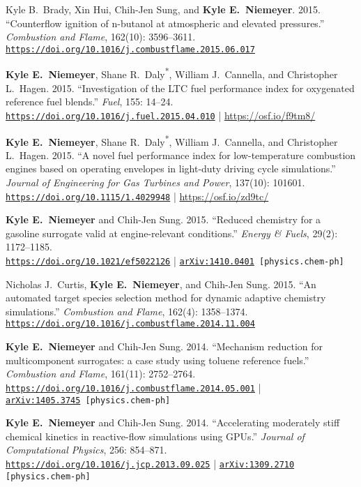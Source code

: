 \documentclass[margin,line,11pt]{res}
\makeatletter
\newlength{\bibhang}
\newlength{\bibsep}
 {\@listi \global\bibsep\itemsep \global\advance\bibsep by\parsep}
\newenvironment{bibenum*}
  {\renewcommand\labelenumi{\theenumi.}%
   \etaremune[
     topsep=0pt,
     itemsep=\bibsep,
     parsep=0pt,partopsep=0pt,
     itemindent=-\bibhang,
     leftmargin={\bibhang+\widthof{[999]}}]}
  {\endetaremune}
\newcommand*{\doi}[1]{\href{https://doi.org/#1}{\nolinkurl{https://doi.org/#1}}}
\makeatother
\begin{document}
\begin{resume}
\begin{bibenum*}
\item Kyle B.~Brady, Xin Hui, Chih-Jen Sung, and \textbf{Kyle E.~Niemeyer}.
2015.
``Counterflow ignition of n-butanol at atmospheric and elevated pressures.''
\emph{Combustion and Flame}, 162(10): 3596--3611.
\doi{10.1016/j.combustflame.2015.06.017}

\item \textbf{Kyle E.~Niemeyer}, Shane R.~Daly\textsuperscript{*}, William J.~Cannella, and Christopher L.~Hagen.
2015.
``Investigation of the LTC fuel performance index for oxygenated reference fuel blends.''
\emph{Fuel}, 155: 14--24.
\doi{10.1016/j.fuel.2015.04.010} | \url{https://osf.io/f9tm8/}

\item \textbf{Kyle E.~Niemeyer}, Shane R.\ Daly\textsuperscript{*}, William J.\ Cannella, and Christopher L.\ Hagen.
2015.
``A novel fuel performance index for low-temperature combustion engines based on operating envelopes in light-duty driving cycle simulations.''
\emph{Journal of Engineering for Gas Turbines and Power}, 137(10): 101601.
\doi{10.1115/1.4029948} | \url{https://osf.io/zd9tc/}

\item \textbf{Kyle E.~Niemeyer} and Chih-Jen Sung.
2015.
``Reduced chemistry for a gasoline surrogate valid at engine-relevant conditions.''
\emph{Energy \& Fuels}, 29(2): 1172--1185. \\
\doi{10.1021/ef5022126} |
{\tt \href{http://arxiv.org/abs/1410.0401}{arXiv:1410.0401} [physics.chem-ph]}

\item Nicholas J.\ Curtis, \textbf{Kyle E.~Niemeyer}, and Chih-Jen Sung.
2015.
``An automated target species selection method for dynamic adaptive chemistry simulations.''
\emph{Combustion and Flame}, 162(4): 1358--1374.
\doi{10.1016/j.combustflame.2014.11.004}

\item \textbf{Kyle E.~Niemeyer} and Chih-Jen Sung.
2014.
``Mechanism reduction for multicomponent surrogates: a case study using toluene reference fuels.''
\emph{Combustion and Flame}, 161(11): 2752--2764.
\doi{10.1016/j.combustflame.2014.05.001} | \\
{\tt \href{http://arxiv.org/abs/1405.3745}{arXiv:1405.3745} [physics.chem-ph]}

\item \textbf{Kyle E.~Niemeyer} and Chih-Jen Sung.
2014.
``Accelerating moderately stiff chemical kinetics in reactive-flow simulations using GPUs.''
\emph{Journal of Computational Physics}, 256: 854--871. \\
\doi{10.1016/j.jcp.2013.09.025} |
{\tt \href{http://arxiv.org/abs/1309.2710}{arXiv:1309.2710} [physics.chem-ph]}


\end{bibenum*}
\end{resume}
\end{document}

